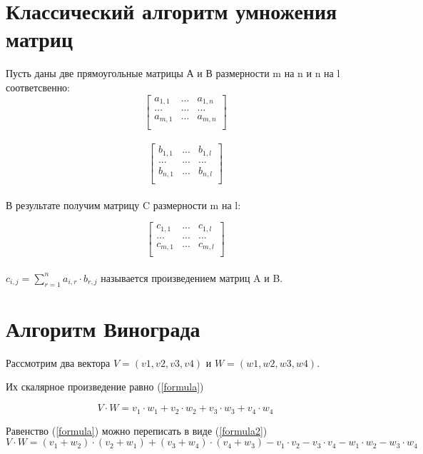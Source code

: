 \documentclass[12pt]{report}
\begin{document}
\section{Классический алгоритм умножения матриц}
Пусть даны две прямоугольные матрицы А и В размерности m на n и n на l соответсвенно: 
\[ \begin{bmatrix}
a_{1,1} & ... & a_{1,n} \\
... & ... & ... \\
a_{m,1} & ... & a_{m,n} \\
\end{bmatrix} \]\\

\[ \begin{bmatrix}
b_{1,1} & ... & b_{1,l} \\
... & ... & ... \\
b_{n,1} & ... & b_{n,l} \\
\end{bmatrix} \]\\

В результате получим матрицу C размерности m на l:
	
\[ \begin{bmatrix}
c_{1,1} & ... & c_{1,l} \\
... & ... & ... \\
c_{m,1} & ... & c_{m,l} \\
\end{bmatrix} \]\\


$c_{i,j} = \sum\limits_{r=1}^n a_{i,r}\cdot b_{r,j}$ называется произведением матриц A и B.


\section{Алгоритм Винограда}

Рассмотрим два вектора $V = (v1, v2, v3, v4)$ и $W = (w1, w2, w3, w4)$.  

Их скалярное произведение равно (\ref{formula}) 

\begin{equation} \label{formula}
	V \cdot W=v_1 \cdot w_1 + v_2 \cdot w_2 + v_3 \cdot w_3 + v_4 \cdot w_4
\end{equation}

Равенство (\ref{formula}) можно переписать в виде (\ref{formula2}) 
\begin{equation} \label{formula2}
	V \cdot W=(v_1 + w_2) \cdot (v_2 + w_1) + (v_3 + w_4) \cdot (v_4 + w_3) - v_1 \cdot v_2 - v_3 \cdot v_4 - w_1 \cdot w_2 - w_3 \cdot w_4
\end{equation}
\end{document}
